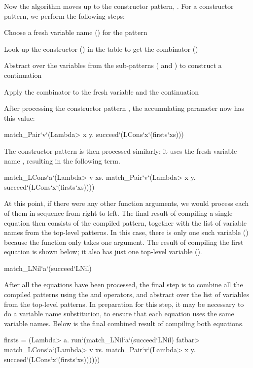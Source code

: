 Now the algorithm moves up to the constructor pattern, . For a constructor pattern, we perform the following steps:
%
\begin{enumerate*}
\item Choose a fresh variable name () for the pattern
\item Look up the constructor () in the table to get the combinator ()
\item Abstract over the variables from the sub-patterns ( and ) to construct a continuation
\item Apply the combinator to the fresh variable and the continuation
\end{enumerate*}
%
After processing the constructor pattern , the accumulating parameter now has this value:
%
\begin{isacode}
match_Pair`v`(\<Lambda> x y. succeed`(LCons`x`(firsts`xs)))
\end{isacode}
%
The  constructor pattern is then processed similarly; it uses the fresh variable name , resulting in the following term.
%
\begin{isacode}
match_LCons`a`(\<Lambda> v xs. match_Pair`v`(\<Lambda> x y. succeed`(LCons`x`(firsts`xs))))
\end{isacode}
%
At this point, if there were any other function arguments, we would process each of them in sequence from right to left. The final result of compiling a single equation then consists of the compiled pattern, together with the list of variable names from the top-level patterns. In this case, there is only one such variable () because the function  only takes one argument. The result of compiling the first equation is shown below; it also has just one top-level variable ().
%
\begin{isacode}
match_LNil`a`(succeed`LNil)
\end{isacode}
%
After all the equations have been processed, the final step is to combine all the compiled patterns using the  and  operators, and abstract over the list of variables from the top-level patterns. In preparation for this step, it may be necessary to do a variable name substitution, to ensure that each equation uses the same variable names. Below is the final combined result of compiling both equations. 
%
\begin{isacode}
firsts = (\<Lambda> a. run`(match_LNil`a`(succeed`LNil) \<fatbar>
  match_LCons`a`(\<Lambda> v xs. match_Pair`v`(\<Lambda> x y. succeed`(LCons`x`(firsts`xs))))))
\end{isacode}
\unmedskip

